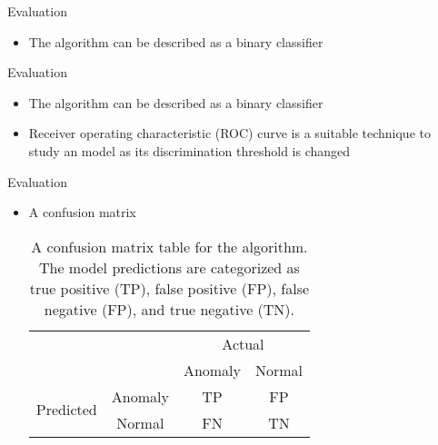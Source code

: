 \begin{frame}{Evaluation}
    \begin{itemize}
        \item The \mlblink algorithm can be described as a binary classifier
    \end{itemize}
\end{frame}

\begin{frame}{Evaluation}
    \begin{itemize}
        \item The \mlblink algorithm can be described as a binary classifier
        \item Receiver operating characteristic (ROC) curve is a suitable technique to study an \mlblink model as its discrimination threshold is changed
    \end{itemize}
\end{frame}

\begin{frame}{Evaluation}
    \begin{itemize}
        \item A confusion matrix
            \begin{table}[H]
                \begin{tabular}{cc|cc}
                    \multicolumn{2}{c}{}
                    & \multicolumn{2}{c}{Actual} \\
                    &       &   Anomaly &   Normal \\ 
                    \cline{2-4}
                    \multirow{2}{*}{Predicted}
                        & Anomaly         & TP   & FP  \\
                        & Normal    & FN   & TN  \\ 
                        \cline{2-4}
                \end{tabular}
                \caption{A confusion matrix table for the \mlblink algorithm. The model predictions are categorized as true positive (TP), false positive (FP), false negative (FP), and true negative (TN).}
                \label{table:confusion-matrix}
            \end{table}
    \end{itemize}
\end{frame}

